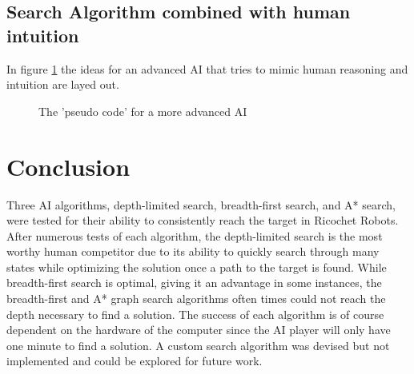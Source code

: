 \documentclass[a4paper,10pt]{article}
\begin{document}
  \subsection{Search Algorithm combined with human intuition}
  In figure \ref{fig:pseudo} the ideas for an advanced AI that tries to mimic human reasoning and intuition are layed out.
  \begin{figure}[!htb]
  \caption{The 'pseudo code' for a more advanced AI}
  \label{fig:pseudo}
  \end{figure}

\section{Conclusion}
Three AI algorithms, depth-limited search, breadth-first search, and A* search, were tested for their ability to consistently reach the target in Ricochet Robots. After numerous tests of each algorithm, the depth-limited search is the most worthy human competitor due to its ability to quickly search through many states while optimizing the solution once a path to the target is found.
While breadth-first search is optimal, giving it an advantage in some instances, the breadth-first and A* graph search algorithms often times could not reach the depth necessary to find a solution.
The success of each algorithm is of course dependent on the hardware of the computer since the AI player will only have one minute to find a solution. A custom search
algorithm was devised but not implemented and could be explored for future work.


\end{document}
